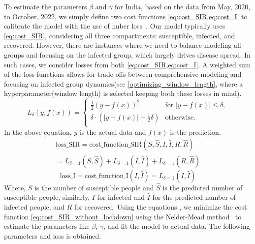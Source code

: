 \documentclass[tikz,fleqn,12pt]{wlscirep}
\begin{document}
To estimate the parameters $\beta$ and $\gamma$ for India, based on the data from May, 2020, to October, 2022, we simply define two cost functions \cref{eq:cost_SIR,eq:cost_I} to calibrate the model with the use of huber loss~\cite{huberloss}. Our model typically uses \cref{eq:cost_SIR}, considering all three compartments: susceptible, infected, and recovered. However, there are instances where we need to balance modeling all groups and focusing on the infected group, which largely drives disease spread. In such cases, we consider losses from both \cref{eq:cost_SIR,eq:cost_I}. A weighted sum of the loss functions allows for trade-offs between comprehensive modeling and focusing on infected group dynamics(see \cref{optimizing_window_length}, where a hyperparameter(window length) is selected keeping both these losses in mind).
\begin{equation}
  L_{\delta}(y, f(x)) = 
  \begin{cases}
    \frac{1}{2}{(y - f(x))^2} & \text{for } |y - f(x)| \leq \delta, \\
    \delta \cdot (|y - f(x)| - \frac{1}{2}\delta) & \text{otherwise.} \\
  \end{cases}
  \label{eq:huberloss}
\end{equation}
In the above equation, $y$ is the actual data and $f(x)$ is the prediction.
\begin{equation}
  \begin{split}
  \textrm{loss\_SIR} = \textrm{cost\_function\_SIR}(S, \hat{S}, I, \hat{I}, R, \hat{R}) \\
  = L_{\delta = 1}(S, \hat{S}) + L_{\delta = 1}(I, \hat{I}) + L_{\delta = 1}(R, \hat{R})
  \end{split}
  \label{eq:cost_SIR}
\end{equation}
\begin{equation}
  \textrm{loss\_I} = \textrm{cost\_function\_I}(I, \hat{I}) = L_{\delta = 1}(I, \hat{I})
  \label{eq:cost_I}
\end{equation}
Where, $S$ is the number of susceptible people and $\hat{S}$ is the predicted number of susceptible people, similarly, $I$ for infected and $\hat{I}$ for the predicted number of infected people, and $R$ for recovered. Using the equations , we minimize the cost function \cref{eq:cost_SIR_without_lockdown} using the Nelder-Mead method~\cite{Gao2010} to estimate the parameters like $\beta$, $\gamma$, and fit the model to actual data. The following parameters and loss is obtained:
\end{document}
